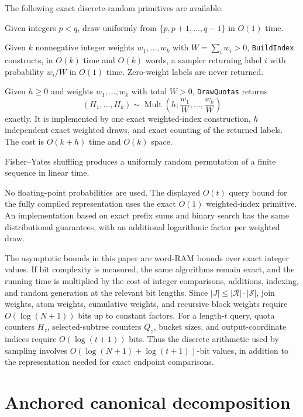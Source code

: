 \documentclass[11pt]{article}
\newcommand{\code}[1]{\texttt{#1}}
\newcommand{\Mult}{\operatorname{Mult}}
\theoremstyle{definition}
\begin{document}
The following exact discrete-random primitives are available.
\begin{description}[leftmargin=1.8em,itemsep=2pt,topsep=2pt]
\item[Uniform integer.] Given integers $p<q$, draw uniformly from $\{p,p+1,\ldots,q-1\}$ in $O(1)$ time.
\item[Weighted index.] Given $k$ nonnegative integer weights $w_1,\ldots,w_k$ with $W=\sum_iw_i>0$, \code{BuildIndex} constructs, in $O(k)$ time and $O(k)$ words, a sampler returning label $i$ with probability $w_i/W$ in $O(1)$ time.  Zero-weight labels are never returned.
\item[Multinomial quotas.] Given $h\ge0$ and weights $w_1,\ldots,w_k$ with total $W>0$, \code{DrawQuotas} returns
\[
  (H_1,\ldots,H_k)\sim
  \Mult\left(h;\frac{w_1}{W},\ldots,\frac{w_k}{W}\right)
\]
exactly.  It is implemented by one exact weighted-index construction, $h$ independent exact weighted draws, and exact counting of the returned labels.  The cost is $O(k+h)$ time and $O(k)$ space.
\item[Shuffle.] Fisher--Yates shuffling produces a uniformly random permutation of a finite sequence in linear time.
\end{description}
No floating-point probabilities are used.  The displayed $O(t)$ query bound for the fully compiled representation uses the exact $O(1)$ weighted-index primitive.  An implementation based on exact prefix sums and binary search has the same distributional guarantees, with an additional logarithmic factor per weighted draw.

The asymptotic bounds in this paper are word-RAM bounds over exact integer values.  If bit complexity is measured, the same algorithms remain exact, and the running time is multiplied by the cost of integer comparisons, additions, indexing, and random generation at the relevant bit lengths.  Since $|J|\le |\mathcal R|\cdot|\mathcal S|$, join weights, atom weights, cumulative weights, and recursive block weights require $O(\log(N+1))$ bits up to constant factors.  For a length-$t$ query, quota counters $H_z$, selected-subtree counters $Q_z$, bucket sizes, and output-coordinate indices require $O(\log(t+1))$ bits.  Thus the discrete arithmetic used by sampling involves $O(\log(N+1)+\log(t+1))$-bit values, in addition to the representation needed for exact endpoint comparisons.

\section{Anchored canonical decomposition}
\label{sec:decomposition}
\end{document}
